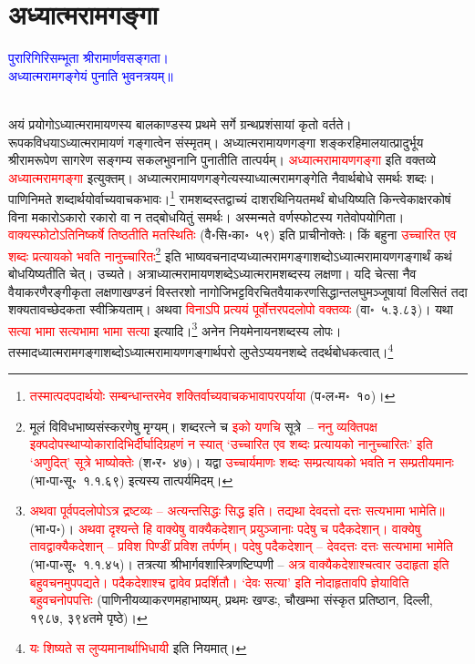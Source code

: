 \section[अध्यात्मरामगङ्गा]{अध्यात्मरामगङ्गा}
\centering\textcolor{blue}{पुरारिगिरिसम्भूता श्रीरामार्णवसङ्गता।\nopagebreak\\
अध्यात्मरामगङ्गेयं पुनाति भुवनत्रयम्॥}\nopagebreak\\
\\
\begin{sloppypar}\justifying\noindent\hspace{10mm} अयं प्रयोगोऽध्यात्म\-रामायणस्य बाल\-काण्डस्य प्रथमे सर्गे ग्रन्थ\-प्रशंसायां कृतो वर्तते। रूपक\-विधयाऽध्यात्म\-रामायणं गङ्गात्वेन संस्मृतम्। अध्यात्म\-रामायण\-गङ्गा शङ्कर\-हिमालयात्प्रादुर्भूय श्रीराम\-रूपेण सागरेण सङ्गम्य सकल\-भुवनानि पुनातीति तात्पर्यम्। \textcolor{red}{अध्यात्म\-रामायण\-गङ्गा} इति वक्तव्ये \textcolor{red}{अध्यात्म\-राम\-गङ्गा} इत्युक्तम्। अध्यात्म\-रामायण\-गङ्गेत्यस्याध्यात्म\-राम\-गङ्गेति नैवार्थ\-बोधे समर्थः शब्दः।
पाणिनि\-मते शब्दार्थयोर्वाच्य\-वाचक\-भावः।\footnote{\textcolor{red}{तस्मात्पद\-पदार्थयोः सम्बन्धान्तरमेव शक्तिर्वाच्य\-वाचक\-भावापर\-पर्याया} (प॰ल॰म॰~१०)।} राम\-शब्दस्तद्वाच्यं दाशरथि\-नियतमर्थं बोधयिष्यति किन्त्वेकाक्षर\-कोषं विना मकारोऽकारो रकारो वा न तद्बोधयितुं समर्थः। अस्मन्मते वर्ण\-स्फोटस्य गतेवोपयोगिता। \textcolor{red}{वाक्य\-स्फोटोऽतिनिष्कर्षे तिष्ठतीति मत\-स्थितिः} (वै॰सि॰का॰~५९) इति प्राचीनोक्तेः। किं बहुना \textcolor{red}{उच्चारित एव शब्दः प्रत्यायको भवति नानुच्चारितः}\footnote{मूलं विविध\-भाष्य\-संस्करणेषु मृग्यम्। शब्द\-रत्ने च \textcolor{red}{इको यणचि} सूत्रे~– \textcolor{red}{ननु व्यक्तिपक्ष इक्पदोप\-स्थाप्योकारादिभिर्दीर्घादि\-ग्रहणं न स्यात् ‘उच्चारित एव शब्दः प्रत्यायको नानुच्चारितः’ इति ‘अणुदित्’ सूत्रे भाष्योक्तेः} (श॰र॰~४७)। यद्वा \textcolor{red}{उच्चार्यमाणः शब्दः सम्प्रत्यायको भवति न सम्प्रतीयमानः} (भा॰पा॰सू॰~१.१.६९) इत्यस्य तात्पर्यमिदम्।} इति भाष्य\-वचनादप्यध्यात्म\-राम\-गङ्गा\-शब्दोऽध्यात्म\-रामायण\-गङ्गार्थं कथं बोधयिष्यतीति चेत्। उच्यते। अत्राध्यात्म\-रामायण\-शब्देऽध्यात्म\-राम\-शब्दस्य लक्षणा। यदि चेत्सा नैव वैयाकरणैरङ्गीकृता लक्षणा\-खण्डनं विस्तरशो नागोजिभट्ट\-विरचित\-वैयाकरण\-सिद्धान्त\-लघु\-मञ्जूषायां विलसितं तदा शक्यतावच्छेदकता स्वीक्रियताम्। अथवा \textcolor{red}{विनाऽपि प्रत्ययं पूर्वोत्तर\-पद\-लोपो वक्तव्यः} (वा॰~५.३.८३)। यथा \textcolor{red}{सत्या भामा सत्यभामा भामा सत्या} इत्यादि।\footnote{\textcolor{red}{अथवा पूर्वपदलोपोऽत्र द्रष्टव्यः – अत्यन्तसिद्धः सिद्ध इति। तद्यथा देवदत्तो दत्तः सत्यभामा भामेति॥} (भा॰प॰)। \textcolor{red}{अथवा दृश्यन्ते हि वाक्येषु वाक्यैकदेशान् प्रयुञ्जानाः पदेषु च पदैकदेशान्। वाक्येषु तावद्वाक्यैकदेशान् – प्रविश पिण्डीं प्रविश तर्पर्णम्। पदेषु पदैकदेशान् – देवदत्तः दत्तः सत्यभामा भामेति} (भा॰पा॰सू॰~१.१.४५)। तत्रत्या श्रीभार्गव\-शास्त्रिणष्टिप्पणी – \textcolor{red}{अत्र वाक्यैकदेशाश्चत्वार उदाहृता इति बहुवचनमुपपद्यते। पदैकदेशाश्च द्वावेव प्रदर्शितौ। ‘देवः सत्या’ इति नोदाहृतावपि ज्ञेयाविति बहुवचनोपपत्तिः} (पाणिनीय\-व्याकरण\-महाभाष्यम्, प्रथमः खण्डः, चौखम्भा संस्कृत प्रतिष्ठान, दिल्ली, १९८७, ३९४तमे पृष्ठे)।} अनेन नियमेनायन\-शब्दस्य लोपः। तस्मादध्यात्म\-राम\-गङ्गा\-शब्दोऽध्यात्म\-रामायण\-गङ्गार्थ\-परो लुप्तेऽप्ययन\-शब्दे तदर्थ\-बोधकत्वात्।\footnote{\textcolor{red}{यः शिष्यते स लुप्यमानार्थाभिधायी} इति नियमात्।}\end{sloppypar}
